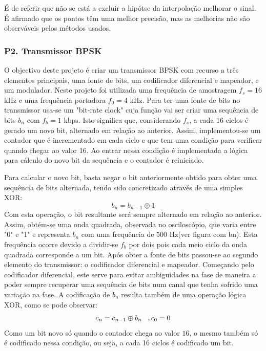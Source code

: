 \documentclass[11pt]{article}
\begin{document}
É de referir que não se está a excluir a hipótse da interpolação melhorar o sinal. É afirmado que os pontos têm uma melhor precisão, mas as melhorias não são observáveis pelos métodos usados.

\subsubsection{P2. Transmissor BPSK}

O objectivo deste projeto é criar um transmissor BPSK com recurso a três elementos principais, uma fonte de bits, um codificador diferencial e mapeador, e um modulador.
Neste projeto foi utilizada uma frequência de amostragem $f_s=16$ kHz e uma frequência portadora $f_0=4$ kHz.
\vfill
Para ter uma fonte de bits no transmissor usa-se um "bit-rate clock" cuja função vai ser criar uma sequência de bits $ b_n $ com $f_b=1$ kbps. Isto significa que, considerando $f_s$, a cada 16 ciclos é gerado um novo bit, alternado em relação ao anterior. Assim, implementou-se um contador que é incrementado em cada ciclo  e que tem uma condição para verificar quando chegar ao valor 16. Ao entrar nessa condição é implementada a lógica para cálculo do novo bit da sequência e o contador é reiniciado.

Para calcular o novo bit, basta negar o bit anteriormente obtido para obter uma sequência de bits alternada, tendo sido concretizado através de uma simples XOR:
\begin{equation}
b_n=b_{n-1} \oplus 1
\end{equation}
Com esta operação, o bit resultante será sempre alternado em relação ao anterior.
Assim, obtém-se uma onda quadrada, observada no osciloscópio, que varia entre "0" e "1" e representa $ b_n $  com uma frequência de $500$ Hz(ver figura com bn). Esta frequência ocorre devido a dividir-se  $f_b$ por dois pois cada meio ciclo da onda quadrada corresponde a um bit.  
\vfill
Após obter a fonte de bits passou-se ao segundo elemento do transmissor: o codificador diferencial e mapeador. Começando pelo codificador diferencial, este serve para evitar ambiguidades na fase de maneira a poder sempre recuperar uma sequência de bits num canal que tenha sofrido uma variação na fase.
A codificação de $b_n$ resulta também de uma operação lógica XOR, como se pode observar: 
\begin{equation}
c_n=c_{n-1} \oplus b_n \hspace{3 mm} ,c_0=0
\end{equation}
Como um bit novo só quando o contador chega ao valor $16$, o mesmo também só é codificado nessa condição, ou seja, a cada 16 ciclos é codificado um bit. 
\end{document}
